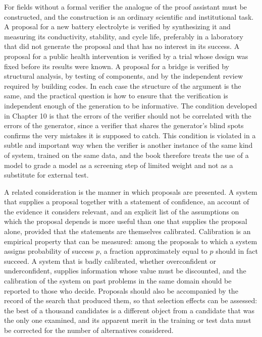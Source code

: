 For fields without a formal verifier the analogue of the proof assistant must be constructed, and the construction is an ordinary scientific and institutional task. A proposal for a new battery electrolyte is verified by synthesizing it and measuring its conductivity, stability, and cycle life, preferably in a laboratory that did not generate the proposal and that has no interest in its success. A proposal for a public health intervention is verified by a trial whose design was fixed before its results were known. A proposal for a bridge is verified by structural analysis, by testing of components, and by the independent review required by building codes. In each case the structure of the argument is the same, and the practical question is how to ensure that the verification is independent enough of the generation to be informative. The condition developed in Chapter 10 is that the errors of the verifier should not be correlated with the errors of the generator, since a verifier that shares the generator's blind spots confirms the very mistakes it is supposed to catch. This condition is violated in a subtle and important way when the verifier is another instance of the same kind of system, trained on the same data, and the book therefore treats the use of a model to grade a model as a screening step of limited weight and not as a substitute for external test.

A related consideration is the manner in which proposals are presented. A system that supplies a proposal together with a statement of confidence, an account of the evidence it considers relevant, and an explicit list of the assumptions on which the proposal depends is more useful than one that supplies the proposal alone, provided that the statements are themselves calibrated. Calibration is an empirical property that can be measured: among the proposals to which a system assigns probability of success $p$, a fraction approximately equal to $p$ should in fact succeed. A system that is badly calibrated, whether overconfident or underconfident, supplies information whose value must be discounted, and the calibration of the system on past problems in the same domain should be reported to those who decide. Proposals should also be accompanied by the record of the search that produced them, so that selection effects can be assessed: the best of a thousand candidates is a different object from a candidate that was the only one examined, and its apparent merit in the training or test data must be corrected for the number of alternatives considered.

